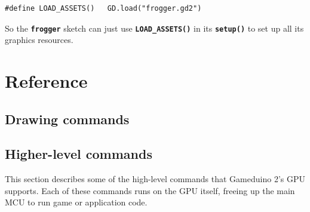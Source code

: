 \documentclass[10pt]{book}
\newcommand{\mach}[1]{\texttt{\textbf{#1}}}
\begin{document}
\begin{CJK}{UTF8}{gkai}
\begin{framed}
\begin{verbatim}
#define LOAD_ASSETS()   GD.load("frogger.gd2")
\end{verbatim}
\end{framed}

\noindent
So the \mach{frogger} sketch can just use \mach{LOAD\_ASSETS()} in its \mach{setup()} to set up all its graphics resources.



\part{Reference}

\chapter{Drawing commands}

\newcommand{\drawcmd}[2]{
\newpage
\section{\texttt{#1}}
\label{#1}
\index{#1@\mach{#1()}|boldindex}

#2

}

\newcommand{\lightcmd}[3]{
\section{\texttt{#1}}
\label{#2}
\index{#1@\mach{#1()}|boldindex}


}



\chapter{Higher-level commands}

This section describes some of the high-level commands
that Gameduino 2's GPU 
supports.
Each of these commands runs on the GPU itself, freeing up the main MCU to
run game or application code.


\end{CJK}
\end{document}
